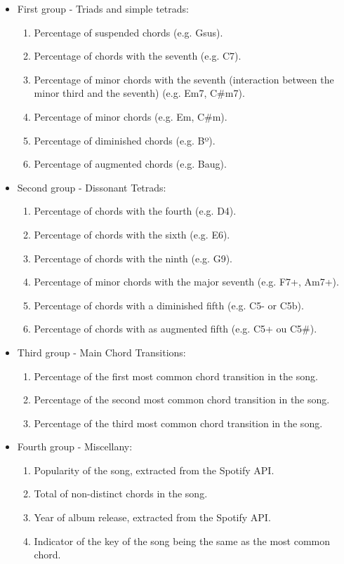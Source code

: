\documentclass[twocolumn]{article}
\begin{document}
\begin{itemize}
    \item First group  - Triads and simple tetrads: 
\begin{enumerate}
\setlength{\itemsep}{0.2pt}
\item Percentage of suspended chords (e.g. Gsus).
\item Percentage of chords with the seventh  (e.g. C7).
\item Percentage of minor chords with the seventh  (interaction between the minor third and the seventh) (e.g. Em7, C\#m7).
\item Percentage of minor chords (e.g. Em, C\#m).
\item Percentage of diminished chords (e.g. Bº).
\item Percentage of augmented chords (e.g. Baug).
\end{enumerate}


\item Second group  - Dissonant Tetrads: 
\begin{enumerate}
\setlength{\itemsep}{0.2pt}
\item Percentage of chords with the fourth (e.g. D4).
\item Percentage of chords with the sixth (e.g. E6).
\item Percentage of chords with the ninth  (e.g. G9).
\item Percentage of minor chords with the major seventh 
(e.g. F7+, Am7+).
\item Percentage of chords with a diminished fifth (e.g. C5- or C5b).
\item Percentage of chords with as augmented fifth (e.g. C5+ ou C5\#).
\end{enumerate}

    \item Third group  - Main Chord Transitions:
\begin{enumerate}
\setlength{\itemsep}{0.2pt}
\item Percentage of the first most common chord transition in the song. 
\item Percentage of the second most common chord transition in the song. 
\item Percentage of the third most common chord transition in the song. 
\end{enumerate}

    \item Fourth group  - Miscellany:

\begin{enumerate}
\setlength{\itemsep}{0.2pt}
\item Popularity of the song, extracted from the Spotify
API.
\item Total of non-distinct chords in the song. 
\item Year of album release, extracted from the Spotify
API.
\item Indicator of the key of the song being the same
as the most common chord.


\end{enumerate}
\end{itemize}
\end{document}
